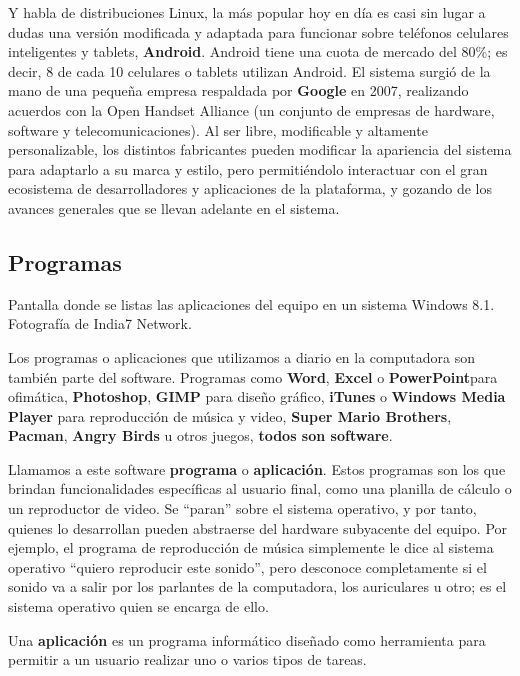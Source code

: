 Y habla de distribuciones Linux, la más popular hoy en día es casi sin lugar a
dudas una versión modificada y adaptada para funcionar sobre teléfonos celulares
inteligentes y tablets, \textbf{Android}. Android tiene una cuota de mercado
del 80\%; es decir, 8 de cada 10 celulares o tablets utilizan Android. El sistema
surgió de la mano de una pequeña empresa respaldada por \textbf{Google} en 2007,
realizando acuerdos con la Open Handset Alliance (un conjunto de empresas de
hardware, software y telecomunicaciones). Al ser libre, modificable y altamente
personalizable, los distintos fabricantes pueden modificar la apariencia del
sistema para adaptarlo a su marca y estilo, pero permitiéndolo interactuar con
el gran ecosistema de desarrolladores y aplicaciones de la plataforma, y gozando
de los avances generales que se llevan adelante en el sistema.

\subsection{Programas}

{Pantalla donde se listas las aplicaciones del equipo en un sistema Windows 8.1.}
{Fotografía de India7 Network.}

Los programas o aplicaciones que utilizamos a diario en la computadora son
también parte del software. Programas como \textbf{Word}, \textbf{Excel} o
\textbf{PowerPoint}para ofimática, \textbf{Photoshop}, \textbf{GIMP} para diseño
gráfico, \textbf{iTunes} o \textbf{Windows Media Player} para reproducción de
música y video, \textbf{Super Mario Brothers}, \textbf{Pacman}, \textbf{Angry
Birds} u otros juegos, \textbf{todos son software}.

Llamamos a este software \textbf{programa} o \textbf{aplicación}.
Estos programas son los que brindan funcionalidades específicas al usuario final,
como una planilla de cálculo o un reproductor de video. Se ``paran'' sobre el
sistema operativo, y por tanto, quienes lo desarrollan pueden abstraerse del
hardware subyacente del equipo. Por ejemplo, el programa de reproducción de
música simplemente le dice al sistema operativo ``quiero reproducir este sonido'',
pero desconoce completamente si el sonido va a salir por los parlantes de la
computadora, los auriculares u otro; es el sistema operativo quien se encarga de
ello.

\begin{definition}
    Una \textbf{aplicación} es un programa informático diseñado como herramienta
    para permitir a un usuario realizar uno o varios tipos de tareas.\autocite{rae_aplicacion_2014}
\end{definition}

